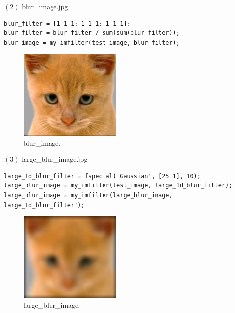 $(2)$ blur\_image.jpg
\begin{lstlisting}[style=Matlab-editor]
blur_filter = [1 1 1; 1 1 1; 1 1 1];
blur_filter = blur_filter / sum(sum(blur_filter));
blur_image = my_imfilter(test_image, blur_filter);
\end{lstlisting}
\begin{figure}[!h]
    \centering
    \includegraphics[width=5cm]{blur_image.jpg}
    \caption{blur\_image.}
    \label{fig:result2}
\end{figure}
\pagebreak
$(3)$ large\_blur\_image.jpg
\begin{lstlisting}[style=Matlab-editor]
large_1d_blur_filter = fspecial('Gaussian', [25 1], 10);
large_blur_image = my_imfilter(test_image, large_1d_blur_filter);
large_blur_image = my_imfilter(large_blur_image, large_1d_blur_filter');
\end{lstlisting}
\begin{figure}[!h]
    \centering
    \includegraphics[width=5cm]{large_blur_image.jpg}
    \caption{large\_blur\_image.}
    \label{fig:result3}
\end{figure}

